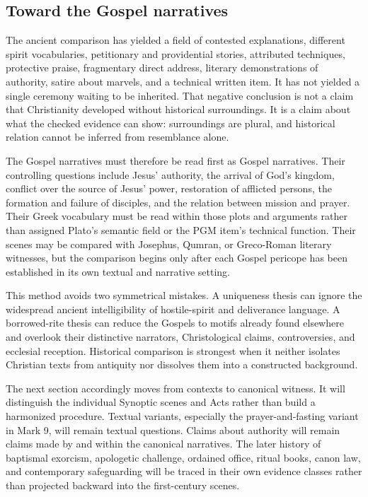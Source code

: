 \subsection{Toward the Gospel narratives}

The ancient comparison has yielded a field of contested explanations,
different spirit vocabularies, petitionary and providential stories,
attributed techniques, protective praise, fragmentary direct address,
literary demonstrations of authority, satire about marvels, and a technical
written item. It has not yielded a single ceremony waiting to be inherited.
That negative conclusion is not a claim that Christianity developed without
historical surroundings. It is a claim about what the checked evidence can
show: surroundings are plural, and historical relation cannot be inferred
from resemblance alone.

The Gospel narratives must therefore be read first as Gospel narratives.
Their controlling questions include Jesus' authority, the arrival of God's
kingdom, conflict over the source of Jesus' power, restoration of afflicted
persons, the formation and failure of disciples, and the relation between
mission and prayer. Their Greek vocabulary must be read within those plots and
arguments rather than assigned Plato's semantic field or the PGM item's
technical function. Their scenes may be compared with Josephus, Qumran, or
Greco-Roman literary witnesses, but the comparison begins only after each
Gospel pericope has been established in its own textual and narrative setting.

This method avoids two symmetrical mistakes. A uniqueness thesis can ignore
the widespread ancient intelligibility of hostile-spirit and deliverance
language. A borrowed-rite thesis can reduce the Gospels to motifs already
found elsewhere and overlook their distinctive narrators, Christological
claims, controversies, and ecclesial reception. Historical comparison is
strongest when it neither isolates Christian texts from antiquity nor
dissolves them into a constructed background.

The next section accordingly moves from contexts to canonical witness. It
will distinguish the individual Synoptic scenes and Acts rather than build a
harmonized procedure. Textual variants, especially the prayer-and-fasting
variant in Mark 9, will remain textual questions. Claims about authority will
remain claims made by and within the canonical narratives. The later history
of baptismal exorcism, apologetic challenge, ordained office, ritual books,
canon law, and contemporary safeguarding will be traced in their own evidence
classes rather than projected backward into the first-century scenes.
